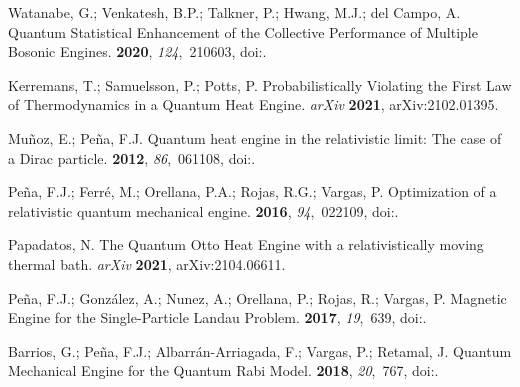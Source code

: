 \documentclass[preprints,article,accept,moreauthors,pdftex]{Definitions/mdpi}
\begin{document}
\begin{thebibliography}{999}
Watanabe, G.; Venkatesh, B.P.; Talkner, P.; Hwang, M.J.; del Campo, A.
\newblock Quantum Statistical Enhancement of the Collective Performance of
  Multiple Bosonic Engines.
 {\bf 2020}, {\em 124},~210603,
\newblock
  doi:{\href{https://doi.org/10.1103/PhysRevLett.124.210603}{}}.

Kerremans, T.; Samuelsson, P.; Potts, P.
\newblock Probabilistically \color{black} Violating the First Law of
  Thermodynamics in a Quantum Heat Engine. \emph{arXiv}  \textbf{2021}, arXiv:2102.01395.


Mu\~noz, E.; Pe\~na, F.J.
\newblock Quantum heat engine in the relativistic limit: The case of a {Dirac}
  particle.
 {\bf 2012}, {\em 86},~061108,
\newblock
  doi:{\href{https://doi.org/10.1103/PhysRevE.86.061108}{}}.

Pe\~na, F.J.; Ferr\'e, M.; Orellana, P.A.; Rojas, R.G.; Vargas, P.
\newblock Optimization of a relativistic quantum mechanical engine.
 {\bf 2016}, {\em 94},~022109,
\newblock
  doi:{\href{https://doi.org/10.1103/PhysRevE.94.022109}{}}.

Papadatos, N.
\newblock The Quantum Otto Heat Engine with a relativistically moving thermal
  bath. \emph{arXiv}  \textbf{2021}, arXiv:2104.06611.

Pe{\~n}a, F.J.; González, A.; Nunez, A.; Orellana, P.; Rojas, R.; Vargas, P.
\newblock Magnetic Engine for the Single-Particle {Landau} Problem.
 {\bf 2017}, {\em 19},~639,
\newblock
  doi:{\href{https://doi.org/10.3390/e19120639}{}}.

Barrios, G.; Pe{\~n}a, F.J.; Albarrán-Arriagada, F.; Vargas, P.; Retamal, J.
\newblock Quantum Mechanical Engine for the Quantum {Rabi} Model.
 {\bf 2018}, {\em 20},~767,
\newblock
  doi:{\href{https://doi.org/10.3390/e20100767}{}}.


\end{thebibliography}
\end{document}

